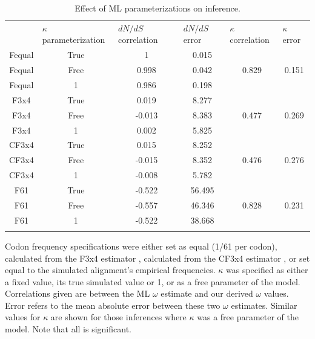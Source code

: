 \documentclass[11pt]{article}
\begin{document}
\begin{table}[htbp]
\caption {\label{tab:mlspec}Effect of ML parameterizations on inference.}
\begin{tabular}{c c c c c c}
\hline\noalign{\smallskip}
\multicolumn{1}{l}{Codon frequencies} & \multicolumn{1}{l}{$\kappa$ parameterization} & \multicolumn{1}{l}{$dN/dS$ correlation} &\multicolumn{1}{l}{$dN/dS$ error} & \multicolumn{1}{l}{$\kappa$ correlation} &\multicolumn{1}{l}{$\kappa$ error} \\
\noalign{\smallskip}\hline\noalign{\smallskip}
Fequal & True & 1 & 0.015 &   &   \\ 
Fequal & Free & 0.998 & 0.042 & 0.829 & 0.151 \\ 
Fequal & 1 & 0.986 & 0.198 &   &   \\ 
\hline\noalign{\smallskip}
F3x4 & True & 0.019 & 8.277 &   &   \\ 
F3x4 & Free & -0.013 & 8.383 & 0.477 & 0.269 \\ 
F3x4 & 1 & 0.002 & 5.825 &   &   \\ 
\hline\noalign{\smallskip}
CF3x4 & True & 0.015 & 8.252 &   &   \\ 
CF3x4 & Free & -0.015 & 8.352 & 0.476 & 0.276 \\ 
CF3x4 & 1 & -0.008 & 5.782 &   &   \\ 
\hline\noalign{\smallskip}
F61 & True & -0.522 & 56.495 &   &   \\ 
F61 & Free & -0.557 & 46.346 & 0.828 & 0.231 \\ 
F61 & 1 & -0.522 & 38.668 &   &   \\ 
\noalign{\smallskip}\hline\noalign{\smallskip}
\end{tabular}
\newline
Codon frequency specifications were either set as equal (1/61 per codon), calculated from the F3x4 estimator \cite{MuseGaut1994}, calculated from the CF3x4 estimator \cite{Pond2010}, or set equal to the simulated alignment's empirical frequencies. $\kappa$ was specified as either a fixed value, its true simulated value or 1, or as a free parameter of the model. Correlations given are between the ML $\omega$ estimate and our derived $\omega$ values. Error refers to the mean absolute error between these two $\omega$ estimates. Similar values for $\kappa$ are shown for those inferences where $\kappa$ was a free parameter of the model. Note that all is significant.
\end{table}	
	
\end{document}

